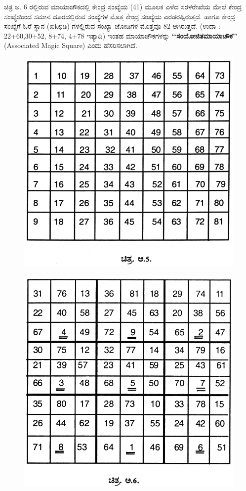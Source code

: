 ಚಿತ್ರ ಅ. 6 ರಲ್ಲಿರುವ ಮಾಯಾಚೌಕದಲ್ಲಿ ಕೇಂದ್ರ ಸಂಖ್ಯೆಯ (41) ಮೂಲಕ ಎಳೆದ ಸರಳರೇಖೆಯ ಮೇಲೆ ಕೇಂದ್ರ ಸಂಖ್ಯೆಯಿಂದ ಸಮಾನ ದೂರದಲ್ಲಿರುವ ಸಂಖ್ಯೆಗಳ ಮೊತ್ತ ಕೇಂದ್ರ ಸಂಖ್ಯೆಯ ಎರಡರಷ್ಟಿರುತ್ತದೆ. ಹಾಗೂ ಕೇಂದ್ರ ಸಂಖ್ಯೆಗೆ ಓರೆ ಸ್ಥಾನ (ಖkಛಿಡಿ) ಗಳಲ್ಲಿರುವ ಸಂಖ್ಯಾ ಜೋಡಿಗಳ ಮೊತ್ತವೂ 82 ಆಗಿರುತ್ತದೆ. (ಉದಾ : 22+60,30+52, 8+74, 4+78 ಇತ್ಯಾದಿ) ಇಂತಹ ಮಾಯಾಚೌಕಗಳನ್ನು \textbf{‘‘ಸಂಯೋಜಿತಮಾಯಾಚೌಕ’’} (Associated Magic Square) ಎಂದು ಹೆಸರಿಸಲಾಗಿದೆ.
\begin{figure}[H]
\includegraphics[scale=1.1]{src/figures/chap9/fig9-4.jpg}
\end{figure}
\begin{figure}[H]
\includegraphics[scale=1.1]{src/figures/chap9/fig9-5.jpg}
\end{figure}

